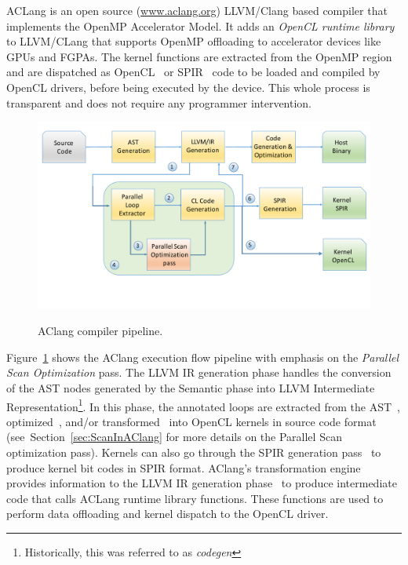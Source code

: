 \documentclass[Ingles]{ic-tese-v1}
\newcommand{\rsec}[1]{Section~\ref{sec:#1}}
\newcommand{\rfig}[1]{Figure~\ref{fig:#1}}
\begin{document}
ACLang is an  open  source (\url{www.aclang.org})  LLVM/Clang
based compiler that implements the  OpenMP Accelerator Model.  It adds
an {\em  OpenCL runtime  library} to  LLVM/CLang that  supports OpenMP
offloading to  accelerator devices  like GPUs  and FGPAs.   The kernel
functions are extracted  from the OpenMP region and  are dispatched as
OpenCL~\cite{opencl}  or  SPIR~\cite{spir}  code   to  be  loaded  and
compiled by OpenCL  drivers, before being executed by  the device. This
whole  process is  transparent  and does  not  require any  programmer
intervention.

\begin{figure}[t]
	\caption{AClang compiler pipeline.}
	\centering
	\includegraphics[scale=0.25]{images/aclang_scan.pdf}
	\label{fig:aclang}
\end{figure}


\rfig{aclang} shows  the AClang execution flow  pipeline with
emphasis on the \textit{Parallel Scan Optimization} pass.  The
LLVM IR generation phase handles the conversion of the AST
nodes  generated   by  the  Semantic  phase   into  LLVM  Intermediate
Representation\footnote{Historically,   this  was   referred  to   as
	\textit{codegen}}.  In this phase, the annotated loops are extracted
from     the      AST~,     optimized~,     and/or
transformed~  into  OpenCL  kernels in  source  code  format~
(see~\rsec{ScanInAClang}   for  more   details   on  the   Parallel Scan
optimization pass).   Kernels can also go  through the SPIR
generation pass~ to produce kernel bit codes in SPIR format.
AClang's  transformation engine~  provides information
to  the LLVM  IR generation  phase~ to  produce intermediate
code  that  calls  ACLang   runtime  library  functions.   These
functions are used  to perform data offloading and  kernel dispatch to
the  OpenCL  driver.
\end{document}
